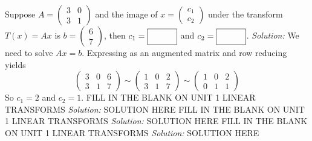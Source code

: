    \else
   \fi 
\fi 
\ifnum {} %
    Suppose $A = \begin{pmatrix} 3 & 0\\3 & 1\end{pmatrix}$ and the image of $x= \begin{pmatrix} c_1 \\ c_2 \end{pmatrix}$ under the transform $T(x) = Ax$ is $b = \begin{pmatrix} 6\\7\end{pmatrix}$, then $c_1 = \framebox{\strut\hspace{1cm}}$ and $c_2 = \framebox{\strut\hspace{1cm}}$. 
    \ifnum {} {\color{DarkBlue} \textit{Solution:} We need to solve $Ax=b$. Expressing as an augmented matrix and row reducing yields
    $$\begin{pmatrix} 3&0&6\\3&1&7\end{pmatrix} 
    \sim \begin{pmatrix} 1&0&2\\3&1&7\end{pmatrix} 
    \sim \begin{pmatrix} 1&0&2\\0&1&1\end{pmatrix} 
    $$ So $c_1 = 2$ and $c_2 = 1$.} \fi  
\fi 
\ifnum {} %
    FILL IN THE BLANK ON UNIT 1 LINEAR TRANSFORMS
    \ifnum {} {\color{DarkBlue} \textit{Solution:} SOLUTION HERE  } \fi    
\fi 
\ifnum {} %
    FILL IN THE BLANK ON UNIT 1 LINEAR TRANSFORMS
    \ifnum {} {\color{DarkBlue} \textit{Solution:} SOLUTION HERE  } \fi    
\fi 
\ifnum {} %
    FILL IN THE BLANK ON UNIT 1 LINEAR TRANSFORMS
    \ifnum {} {\color{DarkBlue} \textit{Solution:} SOLUTION HERE  } \fi    
\fi 
